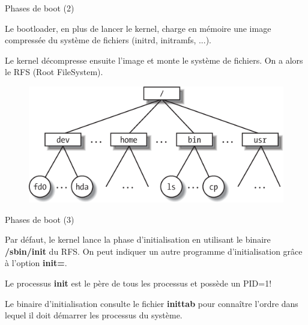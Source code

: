 \documentclass[12pt, t]{beamer}
\begin{document}
\begin{frame}{Phases de boot (2)}

    \vspace{15pt}
    Le bootloader, en plus de lancer le kernel, charge en mémoire une image
    compressée du système de fichiers (initrd, initramfs, ...).

    {
        \vspace{15pt}
        Le kernel décompresse ensuite l'image et monte le système de fichiers. On
        a alors le RFS (Root FileSystem).

        \begin{figure}
            \centering
            \includegraphics[scale=0.4]{rfs.png}
        \end{figure}
    }

\end{frame}


\begin{frame}{Phases de boot (3)}

    \vspace{15pt}
    Par défaut, le kernel lance la phase d'initialisation en utilisant le binaire
    {\textbf{/sbin/init}} du RFS. On peut indiquer un autre programme
    d'initialisation grâce à l'option {\textbf{init=}}.

    \vspace{10pt}
    \lstboot

    {
        \vspace{10pt}
        Le processus {\textbf{init}} est le père de tous les processus et possède
        un PID=1!
    }

    {
        \vspace{10pt}
        Le binaire d'initialisation consulte le fichier {\textbf{inittab}} pour
        connaître l'ordre dans lequel il doit démarrer les processus du système.
    }

\end{frame}
\end{document}
